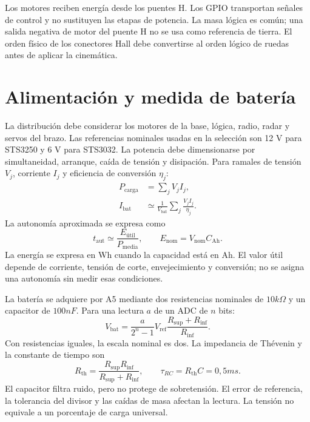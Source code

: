 Los motores reciben energía desde los puentes H. Los GPIO transportan señales de control y no sustituyen las etapas de potencia. La masa lógica es común; una salida negativa de motor del puente H no se usa como referencia de tierra. El orden físico de los conectores Hall debe convertirse al orden lógico de ruedas antes de aplicar la cinemática.

\section{Alimentación y medida de batería}
La distribución debe considerar los motores de la base, lógica, radio, radar y servos del brazo. Las referencias nominales usadas en la selección son 12 V para STS3250 y 6 V para STS3032. La potencia debe dimensionarse por simultaneidad, arranque, caída de tensión y disipación. Para ramales de tensión $V_j$, corriente $I_j$ y eficiencia de conversión $\eta_j$:
\begin{align}
P_{\mathrm{carga}}&=\sum_j V_j I_j,\\
I_{\mathrm{bat}}&\simeq\frac{1}{V_{\mathrm{bat}}}\sum_j\frac{V_jI_j}{\eta_j}.
\end{align}
La autonomía aproximada se expresa como
\begin{equation}
t_{\mathrm{aut}}\simeq\frac{E_{\mathrm{útil}}}{P_{\mathrm{media}}},
\qquad E_{\mathrm{nom}}=V_{\mathrm{nom}}C_{\mathrm{Ah}}.
\end{equation}
La energía se expresa en Wh cuando la capacidad está en Ah. El valor útil depende de corriente, tensión de corte, envejecimiento y conversión; no se asigna una autonomía sin medir esas condiciones.

La batería se adquiere por A5 mediante dos resistencias nominales de $10\unit{k\Omega}$ y un capacitor de $100\unit{nF}$. Para una lectura $a$ de un ADC de $n$ bits:
\begin{equation}
V_{\mathrm{bat}}=\frac{a}{2^n-1}V_{\mathrm{ref}}
\frac{R_{\mathrm{sup}}+R_{\mathrm{inf}}}{R_{\mathrm{inf}}}.
\label{eq:bateria}
\end{equation}
Con resistencias iguales, la escala nominal es dos. La impedancia de Thévenin y la constante de tiempo son
\begin{equation}
R_{\mathrm{th}}=\frac{R_{\mathrm{sup}}R_{\mathrm{inf}}}{R_{\mathrm{sup}}+R_{\mathrm{inf}}},
\qquad \tau_{RC}=R_{\mathrm{th}}C=0{,}5\unit{ms}.
\end{equation}
El capacitor filtra ruido, pero no protege de sobretensión. El error de referencia, la tolerancia del divisor y las caídas de masa afectan la lectura. La tensión no equivale a un porcentaje de carga universal.

